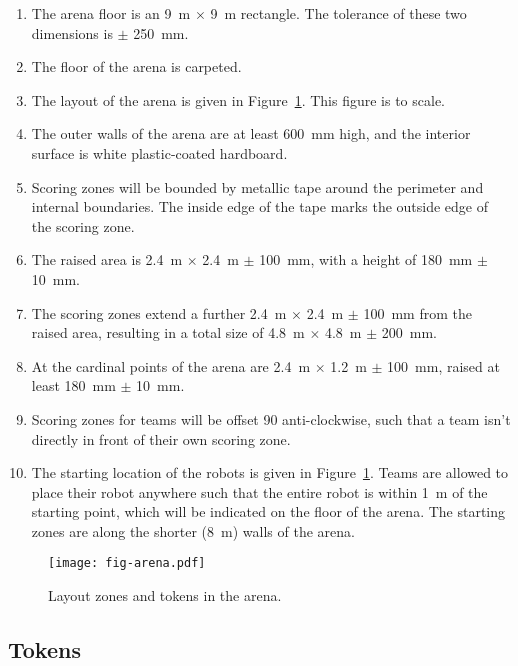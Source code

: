 \begin{enumerate}
  \item The arena floor is an \SI{9}{m} $\times$ \SI{9}{m} rectangle. The
        tolerance of these two dimensions is $\pm$ \SI{250}{mm}.
  \item The floor of the arena is carpeted.
  \item The layout of the arena is given in Figure~\ref{fig:arena}. This
        figure is to scale.
  \item The outer walls of the arena are at least \SI{600}{mm} high, and the
        interior surface is white plastic-coated hardboard.
  \item Scoring zones will be bounded by metallic tape around the perimeter
        and internal boundaries. The inside edge of the tape marks the outside
        edge of the scoring zone.
  \item The raised area is \SI{2.4}{m} $\times$ \SI{2.4}{m} $\pm$ \SI{100}{mm},
        with a height of \SI{180}{mm} $\pm$ \SI{10}{mm}.
  \item The scoring zones extend a further \SI{2.4}{m} $\times$ \SI{2.4}{m} $\pm$ \SI{100}{mm}
        from the raised area, resulting in a total size of \SI{4.8}{m} $\times$ \SI{4.8}{m} $\pm$ \SI{200}{mm}.
  \item At the cardinal points of the arena are \SI{2.4}{m} $\times$ \SI{1.2}{m} $\pm$ \SI{100}{mm},
        raised at least \SI{180}{mm} $\pm$ \SI{10}{mm}.
  \item Scoring zones for teams will be offset 90\degree{} anti-clockwise, such
        that a team isn't directly in front of their own scoring zone.
  \item The starting location of the robots is given in Figure~\ref{fig:arena}.
        Teams are allowed to place their robot anywhere such that the entire
        robot is within \SI{1}{m} of the starting point, which will be
        indicated on the floor of the arena. The starting zones are along the
        shorter (\SI{8}{m}) walls of the arena.
\end{enumerate}

\begin{figure}
  \texttt{[image: fig-arena.pdf]}
  \caption{Layout zones and tokens in the arena.}
  \label{fig:arena}
\end{figure}

\subsection{Tokens}
\label{spec:tokens}

